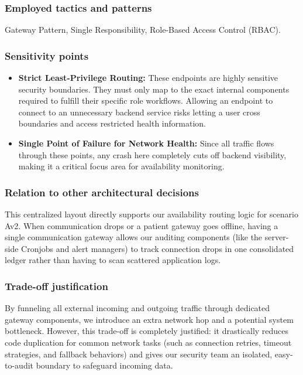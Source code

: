 \subsubsection*{Employed tactics and patterns}
Gateway Pattern, Single Responsibility, Role-Based Access Control (RBAC).

\subsubsection*{Sensitivity points}
\begin{itemize}
	\item \textbf{Strict Least-Privilege Routing:} These endpoints are highly sensitive security boundaries. They must only map to the exact internal components required to fulfill their specific role workflows. Allowing an endpoint to connect to an unnecessary backend service risks letting a user cross boundaries and access restricted health information.
	\item \textbf{Single Point of Failure for Network Health:} Since all traffic flows through these points, any crash here completely cuts off backend visibility, making it a critical focus area for availability monitoring.
\end{itemize}

\subsubsection*{Relation to other architectural decisions}
This centralized layout directly supports our availability routing logic for scenario Av2. When communication drops or a patient gateway goes offline, having a single communication gateway allows our auditing components (like the server-side Cronjobs and alert managers) to track connection drops in one consolidated ledger rather than having to scan scattered application logs.

\subsubsection*{Trade-off justification}
By funneling all external incoming and outgoing traffic through dedicated gateway components, we introduce an extra network hop and a potential system bottleneck. However, this trade-off is completely justified: it drastically reduces code duplication for common network tasks (such as connection retries, timeout strategies, and fallback behaviors) and gives our security team an isolated, easy-to-audit boundary to safeguard incoming data.

